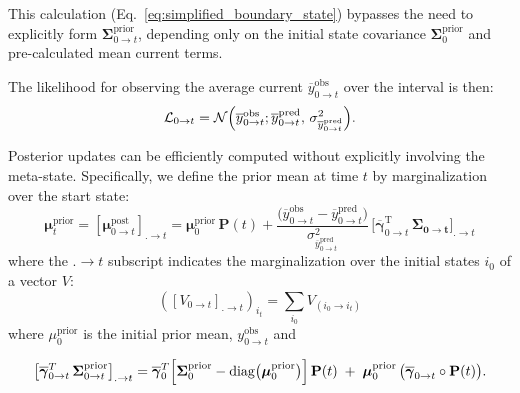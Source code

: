\documentclass[pdflatex,sn-nature]{sn-jnl}%
\begin{document}
This calculation (Eq.~\ref{eq:simplified_boundary_state}) bypasses the need to explicitly form \( \boldsymbol{\Sigma}^{\text{prior}}_{0 \rightarrow t} \), depending only on the initial state covariance \( \boldsymbol{\Sigma}^{\text{prior}}_{0} \) and pre-calculated mean current terms.

The likelihood for observing the average current \( \overline{y}^{\text{obs}}_{0 \rightarrow t} \) over the interval is then:
\begin{equation}
\mathcal{L}_{0 \rightarrow t} =  \mathcal{N}\Bigl( \overline{y}^{\text{obs}}_{0 \rightarrow t} ; \overline{y}^{\text{pred}}_{0 \rightarrow t},\, \sigma^2_{\overline{y}^{\text{pred}}_{0 \rightarrow t}} \Bigr).
\label{eq:macroIR_likelihood}
\end{equation}

Posterior updates can be efficiently computed without explicitly involving the meta-state. Specifically, we define the prior mean at time $t$ by marginalization over the start state:
\begin{equation}
	\boldsymbol{\mu}_{t}^{\text{prior}} 
	= [\boldsymbol{\mu}_{0 \rightarrow t}^{\text{post}}]_{. \rightarrow t}
	= \boldsymbol{\mu}_{0}^{\text{prior}} \, \textbf{P}(t)
	+ \frac{\bigl(\overline{y}_{0\rightarrow t}^{\text{obs}} - \overline{y}_{0\rightarrow t}^{\text{pred}}\bigr)}{\sigma_{\overline{y}_{0\rightarrow t}^{\text{pred}}}^2}
	\,\bigl[ \overline{\boldsymbol{\gamma}}^{\text{T}}_{0 \rightarrow t}\,\boldsymbol{\Sigma_{0 \rightarrow t}}\bigr]_{. \rightarrow t}
    \label{eq:macro_post_update}
\end{equation}
where the $. \rightarrow t$ subscript indicates the marginalization over the initial states $i_0$ of a vector $V$:  
\begin{equation}
  ([V_{0 \rightarrow t}]_{. \rightarrow t})_{i_t} = \sum_{i_0} V_{(i_0 \rightarrow i_t)} \label{eq:start_state_vector_marginalization} 
\end{equation}
where $\mu_{0}^{\text{prior}}$ is the initial prior mean, $y_{0\rightarrow t}^{\text{obs}}$ and 

\begin{equation}
\bigl[\overline{\boldsymbol{\gamma}}_{0 \rightarrow t}^{T}\,\boldsymbol{\Sigma}_{0\rightarrow t}^{\text{prior}} \bigr]_{. \rightarrow t}
= \overline{\boldsymbol{\gamma}}_{0}^{T}
\Bigl[\boldsymbol{\Sigma}_{0}^{\text{prior}} - \mathrm{diag}\bigl(\boldsymbol{\mu}_{0}^{\text{prior}}\bigr)\Bigr]\,
\textbf{P}(t)
\;+\;
\boldsymbol{\mu}_{0}^{\text{prior}}
\,
\bigl(\overline{\boldsymbol{\gamma}}_{0\rightarrow t} \circ \textbf{P}(t)\bigr).
\label{eq:macro_boundary_chain}
\end{equation}
\end{document}
